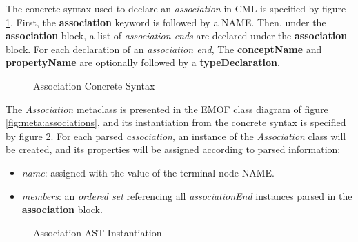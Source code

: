 The concrete syntax used to declare an \emph{association} in CML
is specified by figure \ref{fig:stx:association}.
First, the \textbf{association} keyword is followed by a NAME.
Then, under the \textbf{association} block,
a list of \emph{association ends} are declared under the \textbf{association} block.
For each declaration of an \emph{association end},
The \textbf{conceptName} and \textbf{propertyName} are optionally followed by a \textbf{typeDeclaration}.

\begin{figure}
\verbatimfont{\small}

\caption{Association Concrete Syntax}
\label{fig:stx:association}
\end{figure}

The \emph{Association} metaclass is presented 
in the EMOF \cite{mof} class diagram of figure \ref{fig:meta:associations},
and its instantiation from the concrete syntax is specified by figure \ref{fig:ast:associations}.
For each parsed \emph{association},
an instance of the \emph{Association} class will be created,
and its properties will be assigned
according to parsed information:

\begin{itemize}

\item \emph{name}:
assigned with the value of the terminal node NAME.

\item \emph{members}:
an \emph{ordered set} referencing all \emph{associationEnd}
instances parsed in the \textbf{association} block.

\end{itemize}

\begin{figure}
\verbatimfont{\small}

\caption{Association AST Instantiation}
\label{fig:ast:associations}
\end{figure}
